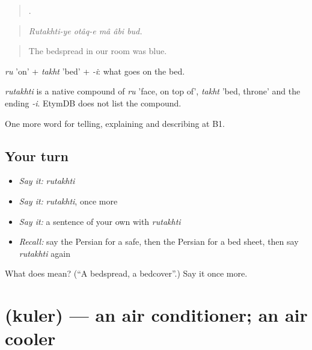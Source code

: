 \begin{quote}
    .
\end{quote}

\begin{quote}
\emph{Rutakhti-ye otâq-e mâ âbi bud.}
\end{quote}

\begin{quote}
The bedspread in our room was blue.
\end{quote}

\emph{ru} 'on' + \emph{takht} 'bed' + \emph{-i}: what goes on the bed.

\begin{cousinweb}
\emph{rutakhti} is a native compound of \emph{ru} 'face, on top of', \emph{takht} 'bed, throne' and the ending \emph{-i}. EtymDB does not list the compound.
\end{cousinweb}

\begin{grammarlens}[title={What you've built}]
One more word for telling, explaining and describing at B1.
\end{grammarlens}

\subsection*{Your turn}
\begin{itemize}
\raggedright
  \item \emph{Say it:} \emph{rutakhti}
  \item \emph{Say it:} \emph{rutakhti}, once more
  \item \emph{Say it:} a sentence of your own with \emph{rutakhti}
  \item \emph{Recall:} say the Persian for a safe, then the Persian for a bed sheet, then say \emph{rutakhti} again
\end{itemize}

\begin{tcolorbox}[breakable,colback=teal!4,colframe=teal!35!black,title={Before you move on}]
What does  mean? (\textquotedblleft{}A bedspread, a bedcover\textquotedblright{}.) Say it once more.
\end{tcolorbox}
\section[\texorpdfstring{\fa{کولر} (kuler)}{کولر (kuler)}]{ (kuler) — an air conditioner; an air cooler}

